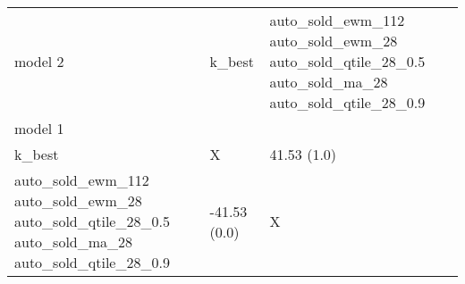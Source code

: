 \begin{tabular}{lll}
\toprule
model 2 & k_best & auto_sold_ewm_112 auto_sold_ewm_28 auto_sold_qtile_28_0.5 auto_sold_ma_28 auto_sold_qtile_28_0.9 \\
model 1 &  &  \\
\midrule
k_best & X & 41.53 (1.0) \\
auto_sold_ewm_112 auto_sold_ewm_28 auto_sold_qtile_28_0.5 auto_sold_ma_28 auto_sold_qtile_28_0.9 & \cellcolor{green} -41.53 (0.0) & X \\
\bottomrule
\end{tabular}

